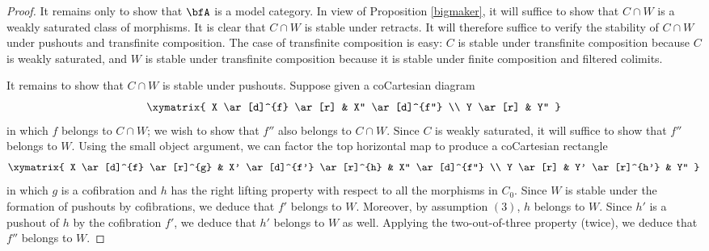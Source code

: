 \begin{Model Categories}
\begin{proof}
It remains only to show that $\bfA$ is a model category. In view of Proposition \ref{bigmaker}, it will suffice to show that $C \cap W$ is a weakly saturated class of morphisms. It is clear that $C \cap W$ is stable under retracts. It will therefore suffice to verify the stability of $C \cap W$ under pushouts and transfinite composition. The case of transfinite composition is easy: $C$ is stable under transfinite composition because $C$ is weakly saturated, and $W$ is stable under transfinite composition because
it is stable under finite composition and filtered colimits.

It remains to show that $C \cap W$ is stable under pushouts. Suppose given a coCartesian diagram
$$ \xymatrix{ X \ar[d]^{f} \ar[r] & X'' \ar[d]^{f''} \\
Y \ar[r] & Y'' }$$
in which $f$ belongs to $C \cap W$; we wish to show that $f''$ also belongs to $C \cap W$. Since
$C$ is weakly saturated, it will suffice to show that $f''$ belongs to $W$. Using the small object argument, we can factor the top horizontal map to produce a coCartesian rectangle
$$ \xymatrix{ X \ar[d]^{f} \ar[r]^{g} & X' \ar[d]^{f'} \ar[r]^{h} & X'' \ar[d]^{f''} \\
Y \ar[r] & Y' \ar[r]^{h'} & Y'' }$$
in which $g$ is a cofibration and $h$ has the right lifting property with respect to all the morphisms in $C_0$. Since $W$ is stable under the formation of pushouts by cofibrations, we deduce that $f'$
belongs to $W$. Moreover, by assumption $(3)$, $h$ belongs to $W$. Since $h'$ is a pushout
of $h$ by the cofibration $f'$, we deduce that $h'$ belongs to $W$ as well. Applying the two-out-of-three property (twice), we deduce that $f''$ belongs to $W$. 
\end{proof}




\end{Model Categories}

